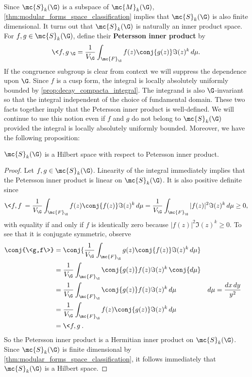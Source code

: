     Since $\mc{S}_{k}(\G)$ is a subspace of $\mc{M}_{k}(\G)$, \cref{thm:modular_forms_space_classification} implies that $\mc{S}_{k}(\G)$ is also finite dimensional. It turns out that $\mc{S}_{k}(\G)$ is naturally an inner product space. For $f,g \in \mc{S}_{k}(\G)$, define their \textbf{Petersson inner product} by
    \[
      \<f,g\>_{\G} = \frac{1}{V_{\G}}\int_{\mc{F}_{\G}}f(z)\conj{g(z)}\Im(z)^{k}\,d\mu.
    \]
    If the congruence subgroup is clear from context we will suppress the dependence upon $\G$. Since $f$ is a cusp form, the integral is locally absolutely uniformly bounded by \cref{prop:decay_compacta_integral}. The integrand is also $\G$-invariant so that the integral independent of the choice of fundamental domain. These two facts together imply that the Petersson inner product is well-defined. We will continue to use this notion even if $f$ and $g$ do not belong to $\mc{S}_{k}(\G)$ provided the integral is locally absolutely uniformly bounded. Moreover, we have the following proposition:

    \begin{proposition}\label{prop:Petersson_inner_product_hermitian}
      $\mc{S}_{k}(\G)$ is a Hilbert space with respect to Petersson inner product.
    \end{proposition}
    \begin{proof}
      Let $f,g \in \mc{S}_{k}(\G)$. Linearity of the integral immediately implies that the Petersson inner product is linear on $\mc{S}_{k}(\G)$. It is also positive definite since
      \[
        \<f,f\> = \frac{1}{V_{\G}}\int_{\mc{F}_{\G}}f(z)\conj{f(z)}\Im(z)^{k}\,d\mu = \frac{1}{V_{\G}}\int_{\mc{F}_{\G}}|f(z)|^{2}\Im(z)^{k}\,d\mu \ge 0,
      \]
      with equality if and only if $f$ is identically zero because $|f(z)|^{2}\Im(z)^{k} \ge 0$. To see that it is conjugate symmetric, observe
      \begin{align*}
        \conj{\<g,f\>} &= \conj{\frac{1}{V_{\G}}\int_{\mc{F}_{\G}}g(z)\conj{f(z)}\Im(z)^{k}\,d\mu} \\
        &= \frac{1}{V_{\G}}\int_{\mc{F}_{\G}}\conj{g(z)}f(z)\Im(z)^{k}\,\conj{d\mu} \\
        &= \frac{1}{V_{\G}}\int_{\mc{F}_{\G}}\conj{g(z)}f(z)\Im(z)^{k}\,d\mu && \text{$d\mu = \frac{dx\,dy}{y^{2}}$} \\
        &= \frac{1}{V_{\G}}\int_{\mc{F}_{\G}}f(z)\conj{g(z)}\Im(z)^{k}\,d\mu \\
        &= \<f,g\>.
      \end{align*}
      So the Petersson inner product is a Hermitian inner product on $\mc{S}_{k}(\G)$. Since $\mc{S}_{k}(\G)$ is finite dimensional by \cref{thm:modular_forms_space_classification}, it follows immediately that $\mc{S}_{k}(\G)$ is a Hilbert space.
    \end{proof}

